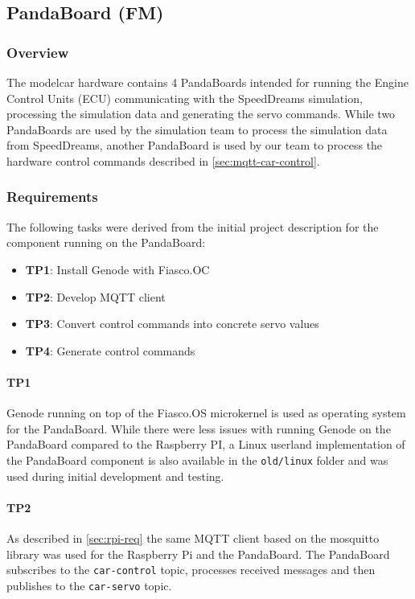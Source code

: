 \subsection{PandaBoard (FM)}
\label{sec:panda}

\subsubsection{Overview}
\label{sec:panda-overview}
The modelcar hardware contains 4 PandaBoards intended for running the Engine Control Units (ECU) communicating with the SpeedDreams simulation, processing the simulation data and generating the servo commands.
While two PandaBoards are used by the simulation team to process the simulation data from SpeedDreams, another Panda\-Board is used by our team to process the hardware control commands described in \autoref{sec:mqtt-car-control}.


\subsubsection{Requirements}
\label{sec:panda-req}
The following tasks were derived from the initial project description for the component running on the PandaBoard:
\begin{itemize}
    \item \textbf{TP1}: Install Genode with Fiasco.OC
    \item \textbf{TP2}: Develop MQTT client
    \item \textbf{TP3}: Convert control commands into concrete servo values
    \item \textbf{TP4}: Generate control commands
\end{itemize}

\paragraph{\textbf{TP1}} Genode running on top of the Fiasco.OS microkernel is used as operating system for the PandaBoard.
While there were less issues with running Genode on the PandaBoard compared to the Raspberry PI, a Linux userland implementation of the PandaBoard component is also available in the \texttt{old/linux} folder and was used during initial development and testing.

\paragraph{\textbf{TP2}} As described in \autoref{sec:rpi-req} the same MQTT client based on the mosquitto library was used for the Raspberry Pi and the PandaBoard.
The PandaBoard subscribes to the \texttt{car-control} topic, processes received messages and then publishes to the \texttt{car-servo} topic.

